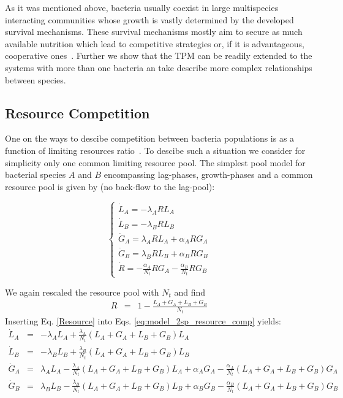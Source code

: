 \documentclass[10pt,A4paper]{article}
\begin{document}
As it was mentioned above, bacteria usually coexist in large multispecies interacting communities whose growth is vastly determined by the developed survival mechanisms.
These survival mechanisms mostly aim to secure as much available nutrition which lead to competitive strategies or, if it is advantageous, cooperative ones~\cite{hibbing_bacterial_2010, stubbendieck_bacterial_2016}.
Further we show that the TPM can be readily extended to the systems with more than one bacteria an take describe more complex relationships between species. 


\subsection{Resource Competition}

One on the ways to descibe competition between bacteria populations is as a function of limiting resources ratio~\cite{tilman_resource_1977, smith_effects_2002}.
To descibe such a situation we consider for simplicity only one common limiting resource pool. 
The simplest pool model for bacterial species $A$ and $B$ encompassing lag-phases, growth-phases and a common resource pool is given by (no back-flow to the lag-pool):

\begin{equation}
    \begin{cases}
        \dot{L}_A = - \lambda_A R L_A\\
        \dot{L}_B = - \lambda_B R L_B \\
        \dot{G}_A = \lambda_A R L_A +\alpha_A R G_A\\
        \dot{G}_B = \lambda_B R L_B +\alpha_B R G_B\\
        \dot{R} =-\frac{\alpha_A}{N_t} R G_A-\frac{\alpha_B}{N_t} R G_B
    \end{cases}
    \label{eq:model_2sp_resource_comp}
\end{equation}

We again rescaled the resource pool with $N_t$ and find
\begin{eqnarray}
\label{Resource}
R &=&1-\frac{L_A+G_A+L_B+G_B}{N_t}
\end{eqnarray}
Inserting Eq. \ref{Resource} into Eqs. \ref{eq:model_2sp_resource_comp} yields:
\begin{eqnarray*}
\dot{L}_A &=& - \lambda_A  L_A + \frac{\lambda_A}{N_t}\left(L_A+G_A+L_B+G_B\right )L_A\\
\dot{L}_B &=& - \lambda_B L_B + \frac{\lambda_B}{N_t}\left(L_A+G_A+L_B+G_B\right )L_B \\
\dot{G}_A &=&  \lambda_A  L_A - \frac{\lambda_A}{N_t}\left(L_A+G_A+L_B+G_B\right )L_A +\alpha_A G_A - \frac{\alpha_A}{N_t}\left(L_A+G_A+L_B+G_B\right )G_A\\
\dot{G}_B &=& \lambda_B L_B - \frac{\lambda_B}{N_t}\left(L_A+G_A+L_B+G_B\right )L_B  +\alpha_B G_B -\frac{\alpha_B}{N_t}\left(L_A+G_A+L_B+G_B\right )G_B
\end{eqnarray*}
\end{document}
